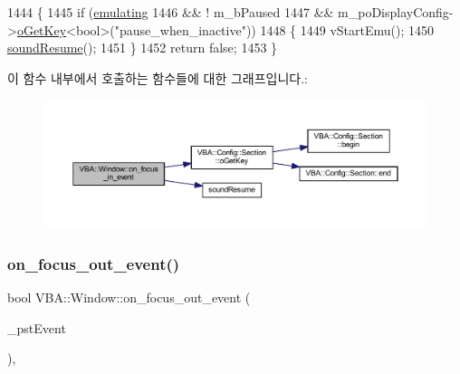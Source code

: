 \begin{DoxyCode}
1444 \{
1445   \textcolor{keywordflow}{if} (\mbox{\hyperlink{gb_globals_8h_af9cc36078b1b311753963297ae7f2a74}{emulating}}
1446       && ! m\_bPaused
1447       && m\_poDisplayConfig->\mbox{\hyperlink{class_v_b_a_1_1_config_1_1_section_ab169d7aae4e9dde91418ba1668e3ad39}{oGetKey}}<\textcolor{keywordtype}{bool}>(\textcolor{stringliteral}{"pause\_when\_inactive"}))
1448   \{
1449     vStartEmu();
1450     \mbox{\hyperlink{gb_sound_8cpp_af13240822604abd91b4e2370062f195e}{soundResume}}();
1451   \}
1452   \textcolor{keywordflow}{return} \textcolor{keyword}{false};
1453 \}
\end{DoxyCode}
이 함수 내부에서 호출하는 함수들에 대한 그래프입니다.\+:
\nopagebreak
\begin{figure}[H]
\begin{center}
\leavevmode
\includegraphics[width=350pt]{class_v_b_a_1_1_window_a12b2428d319af7010bbc689193f1b801_cgraph}
\end{center}
\end{figure}
\mbox{\label{class_v_b_a_1_1_window_a1153e9927db5e913c4364d507adbfc4b}} 
\subsubsection{\texorpdfstring{on\+\_\+focus\+\_\+out\+\_\+event()}{on\_focus\_out\_event()}}
{\footnotesize\ttfamily bool V\+B\+A\+::\+Window\+::on\+\_\+focus\+\_\+out\+\_\+event (\begin{DoxyParamCaption}\item[{Gdk\+Event\+Focus $\ast$}]{\+\_\+pst\+Event }\end{DoxyParamCaption})\hspace{0.3cm}{\ttfamily [protected]}, {\ttfamily [virtual]}}



